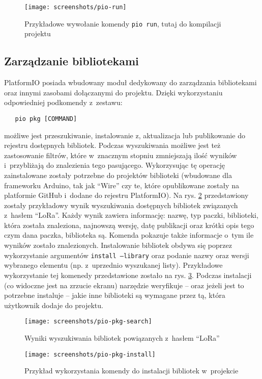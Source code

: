 \begin{figure}[!htbp]
    \centering
    \texttt{[image: screenshots/pio-run]}
    \caption{\label{img:pio-run}Przykładowe wywołanie komendy \texttt{pio run}, tutaj do kompilacji projektu}
\end{figure}

\FloatBarrier
\subsection{Zarządzanie bibliotekami\label{sect:pio-pkg}} PlatformIO posiada wbudowany moduł dedykowany do zarządzania
bibliotekami oraz innymi zasobami dołączanymi do projektu. Dzięki wykorzystaniu odpowiedniej podkomendy z~zestawu:
\begin{verbatim}
   pio pkg [COMMAND]
\end{verbatim}
możliwe jest przeszukiwanie, instalowanie z, aktualizacja lub publikowanie do rejestru dostępnych bibliotek. Podczas
wyszukiwania możliwe jest też zastosowanie filtrów, które w~znacznym stopniu zmniejszają ilość wyników i~przybliżają do
znalezienia tego pasującego. Wykorzysując tę operację zainstalowane zostały potrzebne do projektów biblioteki (wbudowane
dla frameworku Arduino, tak jak \enquote{Wire} czy te, które opublikowane zostały na platformie GitHub i~dodane do
rejestru PlatformIO). Na rys. \ref{img:pio-pkg-search} przedstawiony zostały przykładowy wynik wyszukiwania dostępnych
bibliotek związanych z~hasłem \enquote{LoRa}. Każdy wynik zawiera informację: nazwę, typ paczki, biblioteki, która
została znaleziona, najnowszą wersję, datę publikacji oraz krótki opis tego czym dana paczka, biblioteka są. Komenda
pokazuje także informacje o~tym ile wyników zostało znalezionych. Instalowanie bibliotek obdywa się poprzez
wykorzystanie argumentów \texttt{install --library} oraz podanie nazwy oraz wersji wybranego elementu (np. z~uprzednio
wyszukanej listy). Przykładowe wykorzystanie tej komenedy przedstawione zostało na rys. \ref{img:pio-pkg-install}.
Podczas instalacji (co widoczne jest na zrzucie ekranu) narzędzie weryfikuje -- oraz jeżeli jest to potrzebne instaluje
-- jakie inne biblioteki są wymagane przez tą, która użytkownik dodaje do projektu.

\begin{figure}[!htbp]
    \centering
    \texttt{[image: screenshots/pio-pkg-search]}
    \caption{\label{img:pio-pkg-search}Wyniki wyszukiwania bibliotek powiązanych z~hasłem \enquote{LoRa}}
\end{figure}

\begin{figure}[!htbp]
    \centering
    \texttt{[image: screenshots/pio-pkg-install]}
    \caption{\label{img:pio-pkg-install}Przykład wykorzystania komendy do instalacji bibliotek w~projekcie}
\end{figure}